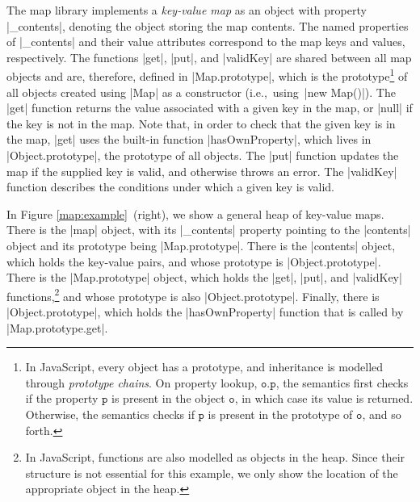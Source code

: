 The map library implements a \emph{key-value map} as an object with property \jsinline|_contents|, denoting the object storing the map contents.  
The named properties of \jsinline|_contents| and their value attributes correspond to the map keys and values, respectively.
The functions \jsinline|get|, \jsinline|put|, and \jsinline|validKey| are shared between all map 
objects and are, therefore, defined in \jsinline|Map.prototype|, which is the prototype\footnote{In JavaScript, every object has a prototype, and inheritance is modelled through \emph{prototype chains}. On property lookup, $\mathtt{o.p}$, the semantics first checks if the property $\mathtt{p}$ is present in the object $\mathtt{o}$, in which case its value is returned. Otherwise, the semantics checks if $\mathtt{p}$ is present in the prototype of $\mathtt{o}$, and so  forth.} of all objects created using \jsinline|Map| as a constructor (i.e.,~using~\jsinline|new Map()|). 
The \jsinline|get| function returns the value associated with a given key in the map, or \jsinline|null| if the key is not in the map. 
Note that, in order to check that the given key is in the map, \jsinline|get| uses the built-in function \jsinline|hasOwnProperty|, which lives in \jsinline|Object.prototype|, the prototype of all objects.
The \jsinline|put| function updates the map if the supplied key is valid, and otherwise throws an error. 
The \jsinline|validKey| function describes the conditions under which a given key is valid. 

In Figure \ref{map:example}~(right), we show a general heap of key-value maps. There is the \jsinline|map| object, with its \jsinline|_contents| property pointing to the \jsinline|contents| object and its prototype being \jsinline|Map.prototype|. There is the \jsinline|contents| object, which holds the key-value pairs, and whose prototype is \jsinline|Object.prototype|. There is the \jsinline|Map.prototype| object, which holds the \jsinline|get|, \jsinline|put|, and \jsinline|validKey| functions,\footnote{In JavaScript, functions are also modelled as objects in the heap. Since their structure is not essential for this example, we only show the location of the appropriate object in the heap.} and whose prototype is also \jsinline|Object.prototype|. Finally, there is \jsinline|Object.prototype|, which holds the \jsinline|hasOwnProperty| function that is called by \jsinline|Map.prototype.get|.


